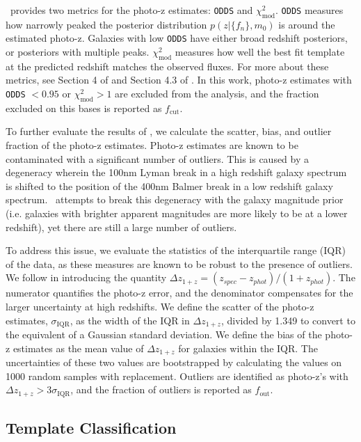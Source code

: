 \bpz\ provides two metrics for the photo-z estimates: \texttt{ODDS} and $\chi_{\text{mod}}^2$.
\texttt{ODDS} measures how narrowly peaked the posterior distribution $p(z|\{f_n\},m_0)$ is around the estimated photo-z.
Galaxies with low \texttt{ODDS} have either broad redshift posteriors, or posteriors with multiple peaks.
$\chi_{\text{mod}}^2$ measures how well the best fit template at the predicted redshift matches the observed fluxes. 
For more about these metrics, see Section 4 of \citet{Benitez2000a} and Section 4.3 of \citet{Coe2006a}.
In this work, photo-z estimates with \texttt{ODDS} $< 0.95$ or $\chi_{\text{mod}}^2 > 1$ are excluded from the analysis, and the fraction excluded on this bases is reported as $f_\text{cut}$.

To further evaluate the results of \bpz, we calculate the scatter, bias, and outlier fraction of the photo-z estimates. 
Photo-z estimates are known to be contaminated with a significant number of outliers.
This is caused by a degeneracy wherein the 100nm Lyman break in a high redshift galaxy spectrum is shifted to the position of the 400nm Balmer break in a low redshift galaxy spectrum. 
\bpz\ attempts to break this degeneracy with the galaxy magnitude prior (i.e. galaxies with brighter apparent magnitudes are more likely to be at a lower redshift), yet there are still a large number of outliers.

To address this issue, we evaluate the statistics of the interquartile range (IQR) of the data, as these measures are known to be robust to the presence of outliers.
We follow \citet{Graham2018a} in introducing the quantity $\Delta z_{1+z} = (z_{spec} - z_{phot})/(1 + z_{phot})$.
The numerator quantifies the photo-z error, and the denominator compensates for the larger uncertainty at high redshifts. 
We define the scatter of the photo-z estimates, $\sigma_\text{IQR}$,  as the width of the IQR in $\Delta z_{1+z}$, divided by 1.349 to convert to the equivalent of a Gaussian standard deviation. 
We define the bias of the photo-z estimates as the mean value of $\Delta z_{1+z}$ for galaxies within the IQR.
The uncertainties of these two values are bootstrapped by calculating the values on 1000 random samples with replacement. 
Outliers are identified as photo-z's with $\Delta z_{1+z} > 3 \sigma_{\text{IQR}}$, and the fraction of outliers is reported as $f_\text{out}$.




\subsection{Template Classification}
\label{sect:classification}
        
